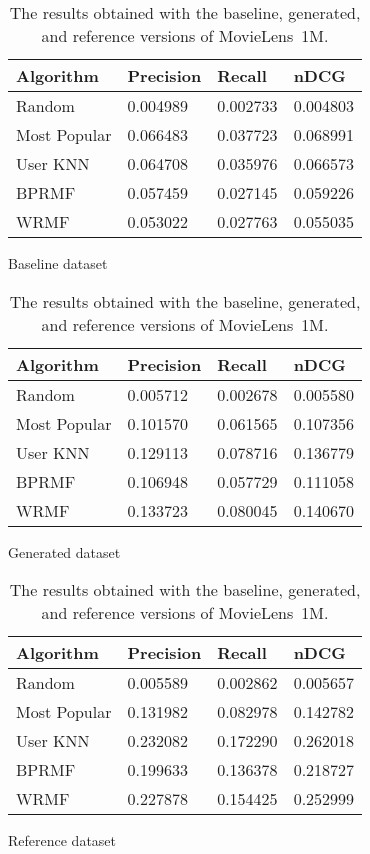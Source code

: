 \begin{table}
\begin{subfigure}{\textwidth}
\centering
\begin{tabular}{@{}llll@{}}
\toprule
Algorithm & Precision & Recall & nDCG \\ \midrule
Random & 0.004989 & 0.002733 & 0.004803 \\
Most Popular & 0.066483 & 0.037723 & 0.068991 \\
User KNN & 0.064708 & 0.035976 & 0.066573 \\
BPRMF & 0.057459 & 0.027145 & 0.059226 \\
WRMF & 0.053022 & 0.027763 & 0.055035 \\ \bottomrule
\end{tabular}
\caption{Baseline dataset}
\bigskip
\end{subfigure}
\begin{subfigure}{\textwidth}
\centering
\begin{tabular}{@{}llll@{}}
\toprule
Algorithm & Precision & Recall & nDCG \\ \midrule
Random & 0.005712 & 0.002678 & 0.005580 \\
Most Popular & 0.101570 & 0.061565 & 0.107356 \\
User KNN & 0.129113 & 0.078716 & 0.136779 \\
BPRMF & 0.106948 & 0.057729 & 0.111058 \\
WRMF & 0.133723 & 0.080045 & 0.140670 \\ \bottomrule
\end{tabular}
\caption{Generated dataset}
\bigskip
\end{subfigure}
\begin{subfigure}{\textwidth}
\centering
\begin{tabular}{@{}llll@{}}
\toprule
Algorithm & Precision & Recall & nDCG \\ \midrule
Random & 0.005589 & 0.002862 & 0.005657 \\
Most Popular & 0.131982 & 0.082978 & 0.142782 \\
User KNN & 0.232082 & 0.172290 & 0.262018 \\
BPRMF & 0.199633 & 0.136378 & 0.218727 \\
WRMF & 0.227878 & 0.154425 & 0.252999 \\ \bottomrule
\end{tabular}
\caption{Reference dataset}
\end{subfigure}
\caption[Experimental results with the synthetic MovieLens~1M]{The results obtained with the baseline, generated, and reference versions of MovieLens~1M.}
\label{syn:tab:movielens-1m}
\end{table}

